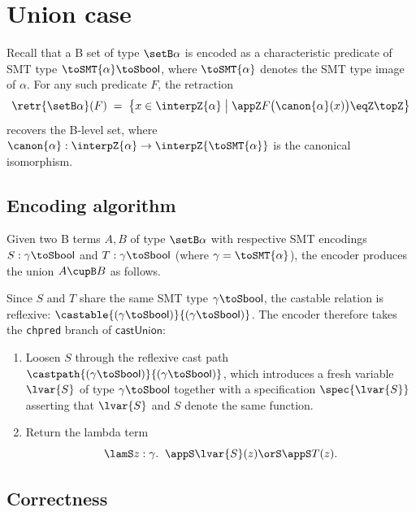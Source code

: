 \section{Union case}
\label{sec:union-case}

Recall that a B set of type $\setB \alpha$ is encoded as a characteristic predicate of SMT type $\toSMT{\alpha} \toS \mathsf{bool}$, where $\toSMT{\alpha}$ denotes the SMT type image of $\alpha$.
For any such predicate $F$, the retraction
\[
\retr{\setB \alpha}(F) \;=\; \bigl\{ x \in \interpZ{\alpha} \;\big|\; \appZ F\bigl(\canon{\alpha}(x)\bigr) \eqZ \topZ \bigr\}
\]
recovers the B-level set, where $\canon{\alpha} : \interpZ{\alpha} \to \interpZ{\toSMT{\alpha}}$ is the canonical isomorphism.

\subsection{Encoding algorithm}

Given two B terms $A, B$ of type $\setB \alpha$ with respective SMT encodings
$S : \gamma \toS \mathsf{bool}$ and $T : \gamma \toS \mathsf{bool}$
(where $\gamma = \toSMT{\alpha}$),
the encoder produces the union $A \cupB B$ as follows.

Since $S$ and $T$ share the same SMT type $\gamma \toS \mathsf{bool}$, the castable relation is reflexive: $\castable{(\gamma \toS \mathsf{bool})}{(\gamma \toS \mathsf{bool})}$.
The encoder therefore takes the \texttt{chpred} branch of $\mathsf{castUnion}$:
\begin{enumerate}
  \item Loosen $S$ through the reflexive cast path $\castpath{(\gamma \toS \mathsf{bool})}{(\gamma \toS \mathsf{bool})}$, which introduces a fresh variable $\lvar{S}$ of type $\gamma \toS \mathsf{bool}$ together with a specification $\spec{\lvar{S}}$ asserting that $\lvar{S}$ and $S$ denote the same function.
  \item Return the lambda term
  \[
    \lamS z : \gamma.\;\; \appS \lvar{S}(z) \orS \appS T(z).
  \]
\end{enumerate}

\subsection{Correctness}

